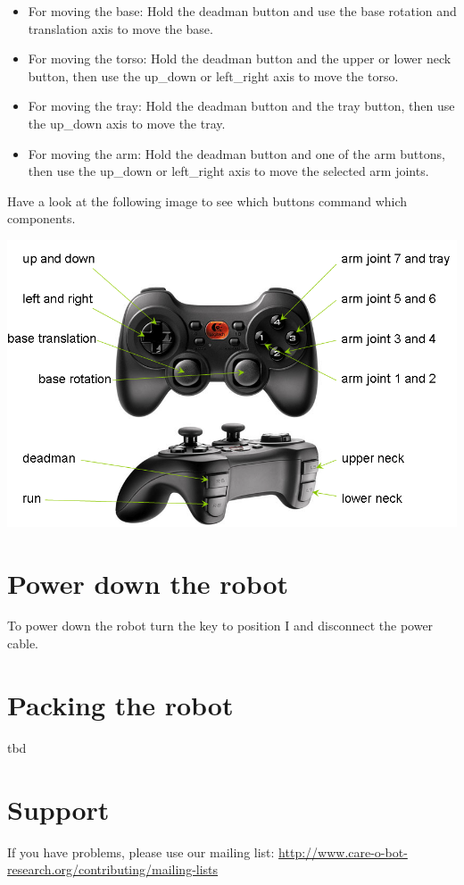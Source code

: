 \begin{itemize}
\item For moving the base: Hold the deadman button and use the base rotation and translation axis to move the base.
\item For moving the torso: Hold the deadman button and the upper or lower neck button, then use the up\_down or left\_right axis to move the torso.
\item For moving the tray: Hold the deadman button and the tray button, then use the up\_down axis to move the tray.
\item For moving the arm: Hold the deadman button and one of the arm buttons, then use the up\_down or left\_right axis to move the selected arm joints.
\end{itemize}

Have a look at the following image to see which buttons command which components. 
\begin{center}
\includegraphics[width=1\textwidth]{images/joystick.png}
\end{center}

\section{Power down the robot}
To power down the robot turn the key to position I and disconnect the power cable.

\section{Packing the robot}
tbd

\section{Support}
If you have problems, please use our mailing list: \url{http://www.care-o-bot-research.org/contributing/mailing-lists}